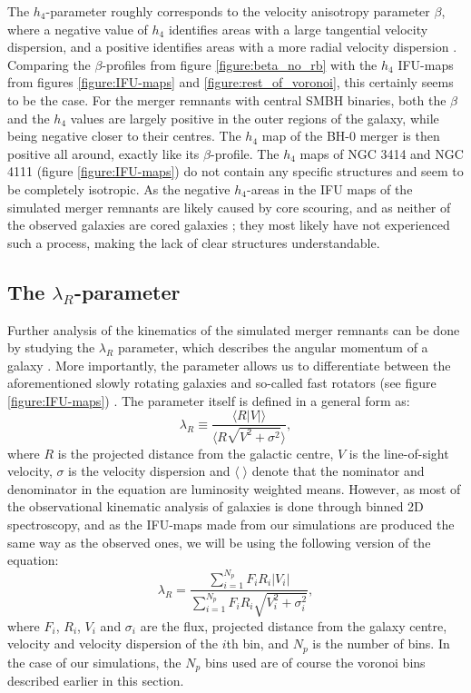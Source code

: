 \documentclass[english, oneside]{HYgradu}
\begin{document}
The $h_4$-parameter roughly corresponds to the velocity anisotropy parameter $\beta$, where a negative value of $h_4$ identifies areas with a large tangential velocity dispersion, and a positive identifies areas with a more radial velocity dispersion \citep{Gerhard1993, Gerhard1998, Thomas2007}. Comparing the $\beta$-profiles from figure \ref{figure:beta_no_rb} with the $h_4$ IFU-maps from figures \ref{figure:IFU-maps} and \ref{figure:rest_of_voronoi}, this certainly seems to be the case. For the merger remnants with central SMBH binaries, both the $\beta$ and the $h_4$ values are largely positive in the outer regions of the galaxy, while being negative closer to their centres. The $h_4$ map of the BH-0 merger is then positive all around, exactly like its $\beta$-profile. The $h_4$ maps of NGC 3414 and NGC 4111 (figure \ref{figure:IFU-maps}) do not contain any specific structures and seem to be completely isotropic. As the negative $h_4$-areas in the IFU maps of the simulated merger remnants are likely caused by core scouring, and as neither of the observed galaxies are cored galaxies \citep{Lauer2007}; they most likely have not experienced such a process, making the lack of clear structures understandable.

\subsection{The $\lambda_R$-parameter}

Further analysis of the kinematics of the simulated merger remnants can be done by studying the $\lambda_R$ parameter, which describes the angular momentum of a galaxy \citep{Emsellem2007}. More importantly, the parameter allows us to differentiate between the aforementioned slowly rotating galaxies and so-called fast rotators (see figure \ref{figure:IFU-maps}) \citep{Emsellem2007}. The parameter itself is defined in a general form as:
\begin{equation}
\lambda_R \equiv \frac{\langle R |V| \rangle}{\langle R \sqrt{V^2 + \sigma^2} \rangle},
\end{equation}
where $R$ is the projected distance from the galactic centre, $V$ is the line-of-sight velocity, $\sigma$ is the velocity dispersion and $\langle \; \rangle$ denote that the nominator and denominator in the equation are luminosity weighted means. However, as most of the observational kinematic analysis of galaxies is done through binned 2D spectroscopy, and as the IFU-maps made from our simulations are produced the same way as the observed ones, we will be using the following version of the equation:
\begin{equation}
\lambda_R = \frac{\sum^{N_p}_{i=1} F_i R_i |V_i|}{\sum^{N_p}_{i=1} F_i R_i \sqrt{V_i^2 + \sigma^2_i}},
\end{equation}
where $F_i$, $R_i$, $V_i$ and $\sigma_i$ are the flux, projected distance from the galaxy centre, velocity and velocity dispersion of the $i$th bin, and $N_p$ is the number of bins. In the case of our simulations, the $N_p$ bins used are of course the voronoi bins described earlier in this section. 
\end{document}
